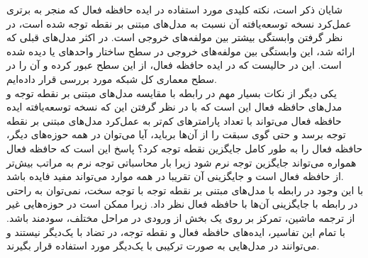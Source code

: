 شایان ذکر است، نکته کلیدی مورد استفاده در ایده حافظه فعال که منجر به برتری عمل‌کرد نسخه توسعه‌یافته آن نسبت به مدل‌های مبتنی بر نقطه توجه شده است، در نظر گرفتن وابستگی بیشتر بین مولفه‌های خروجی است. در اکثر مدل‌های قبلی که ارائه شد، این وابستگی بین مولفه‌های خروجی در سطح ساختار واحدهای  یا  دیده شده است. این در حالیست که در ایده حافظه فعال، از این سطح عبور کرده و آن را در سطح معماری کل شبکه مورد بررسی قرار داده‌ایم.
\\
یکی دیگر از نکات بسیار مهم در رابطه با مقایسه مدل‌های مبتنی بر نقطه توجه و مدل‌های حافظه فعال این است که با در نظر گرفتن این‌ که نسخه توسعه‌یافته ایده حافظه فعال می‌تواند با تعداد پارامترهای کم‌تر به عمل‌کرد مدل‌های مبتنی بر نقطه توجه برسد و حتی گوی سبقت را از آن‌ها برباید، آیا می‌توان در همه حوزه‌های دیگر، حافظه فعال را به طور کامل جایگزین نقطه توجه کرد؟ پاسخ این است که حافظه فعال همواره می‌تواند جایگزین توجه نرم شود زیرا بار محاسباتی توجه نرم به مراتب بیش‌تر از حافظه فعال است و جایگزینی آن تقریبا در همه موارد می‌تواند مفید فایده باشد. 
\\
با این وجود در رابطه با مدل‌های مبتنی بر نقطه توجه با توجه سخت، نمی‌توان به راحتی در رابطه با جایگزینی آن‌ها با حافظه فعال نظر داد. زیرا ممکن است در حوزه‌هایی غیر از ترجمه ماشین، تمرکز بر روی یک بخش از ورودی در مراحل مختلف، سودمند باشد. با تمام این تفاسیر، ایده‌های حافظه فعال و نقطه توجه، در تضاد با یک‌دیگر نیستند و می‌توانند در مد‌ل‌هایی به صورت ترکیبی با یک‌دیگر مورد استفاده قرار بگیرند.

